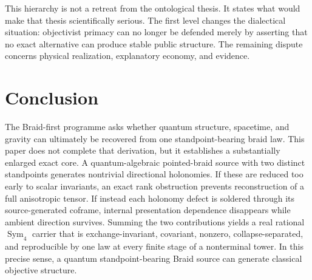 \documentclass[11pt]{article}
\theoremstyle{definition}
\theoremstyle{remark}
\newcommand{\Sym}{\operatorname{Sym}}
\begin{document}
This hierarchy is not a retreat from the ontological thesis. It states what would make that thesis scientifically serious. The first level changes the dialectical situation: objectivist primacy can no longer be defended merely by asserting that no exact alternative can produce stable public structure. The remaining dispute concerns physical realization, explanatory economy, and evidence.

\section{Conclusion}

The Braid-first programme asks whether quantum structure, spacetime, and gravity can ultimately be recovered from one standpoint-bearing braid law. This paper does not complete that derivation, but it establishes a substantially enlarged exact core. A quantum-algebraic pointed-braid source with two distinct standpoints generates nontrivial directional holonomies. If these are reduced too early to scalar invariants, an exact rank obstruction prevents reconstruction of a full anisotropic tensor. If instead each holonomy defect is soldered through its source-generated coframe, internal presentation dependence disappears while ambient direction survives. Summing the two contributions yields a real rational $\Sym_4$ carrier that is exchange-invariant, covariant, nonzero, collapse-separated, and reproducible by one law at every finite stage of a nonterminal tower. In this precise sense, a quantum standpoint-bearing Braid source can generate classical objective structure.
\end{document}
